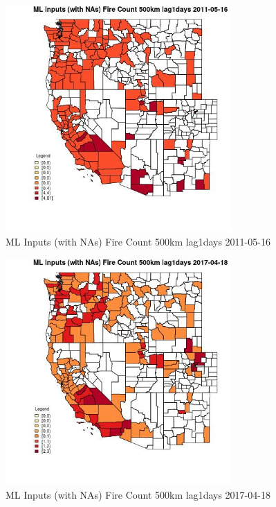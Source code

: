 \begin{figure} 
\centering  
\includegraphics[width=0.77\textwidth]{Code_Outputs/Report_ML_input_PM25_Step4_part_e_de_duplicated_aves_compiled_2019-05-20wNAs_CountyFire_Count_500km_lag1daysMean2011-05-16.jpg} 
\caption{\label{fig:Report_ML_input_PM25_Step4_part_e_de_duplicated_aves_compiled_2019-05-20wNAsCountyFire_Count_500km_lag1daysMean2011-05-16}ML Inputs (with NAs) Fire Count 500km lag1days 2011-05-16} 
\end{figure} 
 

\begin{figure} 
\centering  
\includegraphics[width=0.77\textwidth]{Code_Outputs/Report_ML_input_PM25_Step4_part_e_de_duplicated_aves_compiled_2019-05-20wNAs_CountyFire_Count_500km_lag1daysMean2017-04-18.jpg} 
\caption{\label{fig:Report_ML_input_PM25_Step4_part_e_de_duplicated_aves_compiled_2019-05-20wNAsCountyFire_Count_500km_lag1daysMean2017-04-18}ML Inputs (with NAs) Fire Count 500km lag1days 2017-04-18} 
\end{figure} 
 

